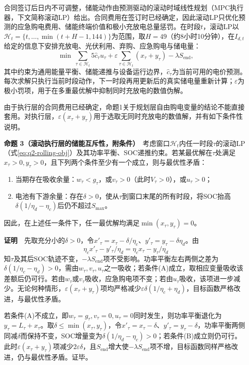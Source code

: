 合同签订后日内不可调整，储能动作由预测驱动的滚动时域线性规划（MPC执行器，下文简称滚动LP）给出。合同费用在签订时已经确定，因此滚动LP只优化预测的应急购电费用、储能终端价值和极小充放电总量惩罚。在时段$t$，滚动LP以$\mathcal H_t=\{t,\dots,\min(t+H-1,144)\}$为范围，取$H=49$（约8小时10分钟），在$I_{d,t}$给定的信息下安排充放电、光伏利用、弃购、应急购电与储电量：
\begin{equation}
\min\ \sum_{\tau\in\mathcal H_t}5\widehat c_\tau u_\tau
+\varepsilon\sum_{\tau\in\mathcal H_t}\left(x_\tau+y_\tau\right)-\lambda S_{\mathrm{end}},
\label{eq:q2-rolling-obj}
\end{equation}
其中约束为通用能量平衡、储能递推与设备运行边界，$\widehat c_\tau$为当前可用的电价预测。每次求解只执行当前时段动作，下一时段再用更新后的真实储电量重新计算；$\varepsilon$为极小罚项，用于在多重最优解中抑制同时充放电的数值伪解。

由于执行层的合同费用已经确定，命题1关于规划层自由购电变量的结论不能直接套用。对执行层，$\varepsilon(x_\tau+y_\tau)$用于选取无同时充放电的数值解，并有如下条件性说明。

\noindent\textbf{命题 3（滚动执行层的储能互斥性，附条件）}　考虑窗口$\mathcal H_t$内任一时段$\tau$的滚动LP（式\eqref{eq:q2-rolling-obj}）及其功率平衡、SOC递推约束。若某最优解在$\tau$处满足$x_\tau>0,y_\tau>0$，且下列两个条件至少有一个成立，则与最优性矛盾：
\begin{enumerate}[label=(\Alph*)]
    \item 当期存在吸收余量：$w_\tau<g_\tau$，或$v_\tau>0$（此时$V_\tau>0$），或$u_\tau>0$；
    \item 电池有下游余量：存在$\delta>0$，使从$\tau$到窗口末尾的所有时段，将SOC抬高$\delta(1/\eta_d-\eta_c)$后仍不超过$S_{\max}$。
\end{enumerate}
因此，在上述任一条件下，任一最优解均满足$\min(x_\tau,y_\tau)=0$。

\noindent\textbf{证明}　先取充分小的$\delta>0$，令$x'_\tau=x_\tau-\delta/\eta_c$、$y'_\tau=y_\tau-\delta\eta_d$。由
\[
\eta_cx'_\tau-y'_\tau/\eta_d=\eta_cx_\tau-y_\tau/\eta_d
\]
知$\tau$及其后SOC轨迹不变，$-\lambda S_{\mathrm{end}}$项不受影响。功率平衡左右两侧之差为$\delta(1/\eta_c-\eta_d)>0$，需由$w_\tau,v_\tau,u_\tau$之一吸收；若条件(A)成立，取相应变量吸收该差额后仍可行。若由$w_\tau$或$v_\tau$吸收，应急购电项不变；若由$u_\tau$吸收，该项进一步减少。无论何种情形，$\varepsilon(x_\tau+y_\tau)$项均严格减少$\varepsilon\delta(1/\eta_c+\eta_d)$，目标函数严格改进，与最优性矛盾。

若条件(A)不成立，即$w_\tau=g_\tau,v_\tau=0,u_\tau=0$同时发生，则功率平衡退化为$y_\tau=L_\tau+x_\tau$。取$\delta\leq\min(x_\tau,y_\tau)$，令$x'_\tau=x_\tau-\delta$、$y'_\tau=y_\tau-\delta$，功率平衡两侧同减$\delta$而保持不变，SOC增量变为$\delta(1/\eta_d-\eta_c)>0$；若条件(B)成立则仍可行。此时$\varepsilon(x_\tau+y_\tau)$项减少$2\varepsilon\delta$，且$S_{\mathrm{end}}$增大使$-\lambda S_{\mathrm{end}}$项不增，目标函数同样严格改进，仍与最优性矛盾。证毕。

